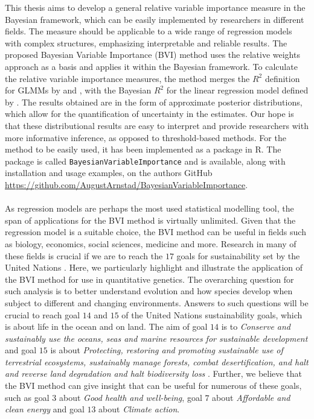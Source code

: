 This thesis aims to develop a general relative variable importance measure in the Bayesian framework, which can be easily implemented by researchers in different fields. The measure should be applicable to a wide range of regression models with complex structures, emphasizing interpretable and reliable results. The proposed Bayesian Variable Importance (BVI) method uses the relative weights approach as a basis and applies it within the Bayesian framework. To calculate the relative variable importance measures, the method merges the $R^2$ definition for GLMMs by \citet{nakagawa2013general} and \citet{nakagawa2017}, with the Bayesian $R^2$ for the linear regression model defined by \citet{gelman2017rsquared}. The results obtained are in the form of approximate posterior distributions, which allow for the quantification of uncertainty in the estimates. Our hope is that these distributional results are easy to interpret and provide researchers with more informative inference, as opposed to threshold-based methods. For the method to be easily used, it has been implemented as a package in R. The package is called \texttt{BayesianVariableImportance} and is available, along with installation and usage examples, on the authors GitHub \url{https://github.com/AugustArnstad/BayesianVariableImportance}. 
\\
\\
As regression models are perhaps the most used statistical modelling tool, the span of applications for the BVI method is virtually unlimited. Given that the regression model is a suitable choice, the BVI method can be useful in fields such as biology, economics, social sciences, medicine and more. Research in many of these fields is crucial if we are to reach the $17$ goals for sustainability set by the United Nations \citep{un_sdg_goals}. Here, we particularly highlight and illustrate the application of the BVI method for use in quantitative genetics. The overarching question for such analysis is to better understand evolution and how species develop when subject to different and changing environments. Answers to such questions will be crucial to reach goal $14$ and $15$ of the United Nations sustainability goals, which is about life in the ocean and on land. The aim of goal $14$ is to \textit{Conserve and sustainably use the oceans, seas and marine resources for sustainable development} and goal $15$ is about \textit{Protecting, restoring and promoting sustainable use of terrestrial ecosystems, sustainably manage forests, combat desertification, and halt and reverse land degradation and halt biodiversity loss} \citep{un_sdg_goals}. Further, we believe that the BVI method can give insight that can be useful for numerous of these goals, such as goal $3$ about \textit{Good health and well-being}, goal $7$ about \textit{Affordable and clean energy} and goal $13$ about \textit{Climate action}.
